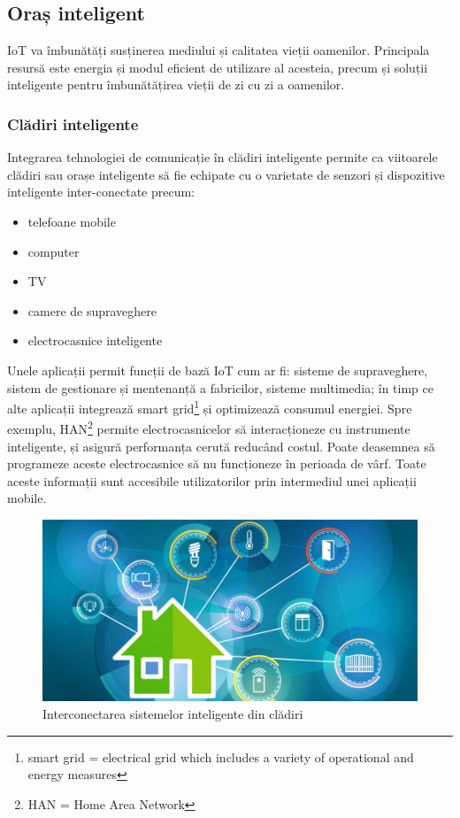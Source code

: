 \documentclass[12pt,a4paper]{report}
\begin{document}
\subsection{Oraș inteligent}
IoT va îmbunătăți susținerea mediului și calitatea vieții oamenilor. Principala resursă este energia și modul eficient de utilizare al acesteia, precum și soluții inteligente pentru îmbunătățirea vieții de zi cu zi a oamenilor.

\subsubsection{Clădiri inteligente}
Integrarea tehnologiei de comunicație în clădiri inteligente permite ca viitoarele clădiri sau orașe inteligente să fie echipate cu o varietate de senzori și dispozitive inteligente inter-conectate precum:
\begin{itemize}
	\item{telefoane mobile}
	\item{computer}
	\item{TV}
	\item{camere de supraveghere}
	\item{electrocasnice inteligente}
\end{itemize}
Unele aplicații permit funcții de bază IoT cum ar fi: sisteme de supraveghere, sistem de gestionare și mentenanță a fabricilor, sisteme multimedia; în timp ce alte aplicații integrează smart grid\footnote{smart grid = electrical grid which includes a variety of operational and energy measures} și optimizează consumul energiei. Spre exemplu, HAN\footnote{HAN = Home Area Network} permite electrocasnicelor să interacționeze cu instrumente inteligente, și asigură performanța cerută reducând costul. Poate deasemnea să programeze aceste electrocasnice să nu funcționeze în perioada de vârf. Toate aceste informații sunt accesibile utilizatorilor prin intermediul unei aplicații mobile.
\begin{figure}[th]
\centering
\includegraphics{pics/iot_home.jpg}
  \caption{Interconectarea sistemelor inteligente din clădiri}
  \label{fig:iot_home}
\end{figure}
\end{document}
